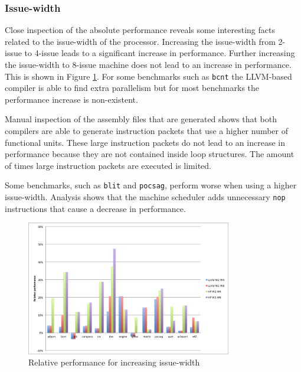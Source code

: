 \subsubsection{Issue-width}
Close inspection of the absolute performance reveals some interesting facts related to the issue-width of the processor. Increasing the issue-width from 2-issue to 4-issue leads to a significant increase in performance. Further increasing the issue-width to 8-issue machine does not lead to an increase in performance. This is shown in Figure \ref{fig:rel_issue}. For some benchmarks such as \texttt{bcnt} the LLVM-based compiler is able to find extra parallelism but for most benchmarks the performance increase is non-existent.

Manual inspection of the assembly files that are generated shows that both compilers are able to generate instruction packets that use a higher number of functional units. These large instruction packets do not lead to an increase in performance because they are not contained inside loop structures. The amount of times large instruction packets are executed is limited.

Some benchmarks, such as \texttt{blit} and \texttt{pocsag}, perform worse when using a higher issue-width. Analysis shows that the machine scheduler adds unnecessary \texttt{nop} instructions that cause a decrease in performance.

\begin{figure}[ht]
\centering
\includegraphics[width=0.8\textwidth]{5_results/img/rel_issue.png}
\caption{Relative performance for increasing issue-width}
\label{fig:rel_issue}
\end{figure}

